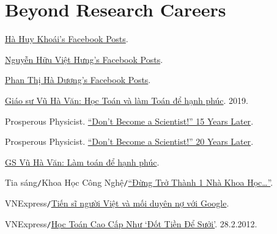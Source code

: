 \documentclass{article}
\numberwithin{equation}{section}
\begin{document}
\section{Beyond Research Careers}


\begin{thebibliography}{99}
	 \href{https://www.facebook.com/hahuy.khoai}{Hà Huy Khoái's Facebook Posts}.
	
	 \href{https://www.facebook.com/nhvhung}{Nguyễn Hữu Việt Hưng's Facebook Posts}.
	
	 \href{https://www.facebook.com/phan.t.duong.9}{Phan Thị Hà Dương's Facebook Posts}.
	
	 \href{https://www.mathvn.com/2019/03/giao-su-vu-ha-van-hoc-toan-va-lam-toan.html}{Giáo sư Vũ Hà Văn: Học Toán và làm Toán để hạnh phúc}. 2019.
	
	 Prosperous Physicist. \href{https://www.prosperousphysicist.com/dont-become-a-scientist-15-years-later/}{``Don't Become a Scientist!'' 15 Years Later}.
	
	 Prosperous Physicist. \href{http://www.prosperousphysicist.com/dont-become-a-scientist-20-years-later/}{``Don't Become a Scientist!'' 20 Years Later}.
	
	 \href{https://thanhnien.vn/gs-vu-ha-van-lam-toan-de-hanh-phuc-post15849.html}{GS Vũ Hà Văn: Làm toán để hạnh phúc}.
	
	 Tia sáng\texttt{/}Khoa Học Công Nghệ\texttt{/}\href{https://tiasang.com.vn/khoa-hoc-cong-nghe/dung-tro-thanh-mot-nha-khoa-hoc-903}{``Đừng Trở Thành 1 Nhà Khoa Học\ldots''}.
	
	 VNExpress\texttt{/}\href{https://vnexpress.net/tien-si-nguoi-viet-va-moi-duyen-no-voi-google-4430615.html}{Tiến sĩ người Việt và mối duyên nợ với Google}.
	
	 VNExpress\texttt{/}\href{https://vnexpress.net/hoc-toan-cao-cap-nhu-dot-tien-de-suoi-2223794.html}{Học Toán Cao Cấp Như `Đốt Tiền Để Sưởi'}. 28.2.2012.
\end{thebibliography}
\end{document}
